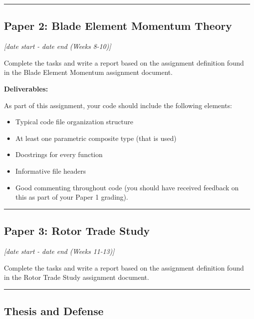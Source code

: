 \documentclass[12pt]{article}
\begin{document}
\vspace{1em}\hrule\vspace{1em}
\subsection{Paper 2: Blade Element Momentum Theory}
\label{ssec:p2}

\textit{[date start - date end (Weeks 8-10)]}

\bigskip

Complete the tasks and write a report based on the assignment definition found in the Blade Element Momentum assignment document.

\bigskip

\noindent \textbf{Deliverables:}

As part of this assignment, your code should include the following elements:
\begin{itemize}
	\item Typical code file organization structure
	\item At least one parametric composite type (that is used)
	\item Docstrings for every function
	\item Informative file headers
	\item Good commenting throughout code (you should have received feedback on this as part of your Paper 1 grading).
\end{itemize}


\vspace{1em}\hrule\vspace{1em}
\subsection{Paper 3: Rotor Trade Study}
\label{ssec:p3}

\textit{[date start - date end (Weeks 11-13)]}

\bigskip

Complete the tasks and write a report based on the assignment definition found in the Rotor Trade Study assignment document.
	
\bigskip

\vspace{1em}\hrule\vspace{1em}
\subsection{Thesis and Defense}
\label{sec:finalreport}
\end{document}
